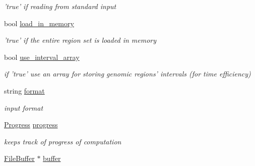 \begin{CompactItemize}
\begin{CompactList}\small\item\em 'true' if reading from standard input \item\end{CompactList}\item 
\hypertarget{classGenomicRegionSet_de43c6cd72b95da75395129b00a52687}{
bool \hyperlink{classGenomicRegionSet_de43c6cd72b95da75395129b00a52687}{load\_\-in\_\-memory}}
\label{classGenomicRegionSet_de43c6cd72b95da75395129b00a52687}

\begin{CompactList}\small\item\em 'true' if the entire region set is loaded in memory \item\end{CompactList}\item 
\hypertarget{classGenomicRegionSet_ea8b5c9bae036da50d4e8720d2e13231}{
bool \hyperlink{classGenomicRegionSet_ea8b5c9bae036da50d4e8720d2e13231}{use\_\-interval\_\-array}}
\label{classGenomicRegionSet_ea8b5c9bae036da50d4e8720d2e13231}

\begin{CompactList}\small\item\em if 'true' use an array for storing genomic regions' intervals (for time efficiency) \item\end{CompactList}\item 
\hypertarget{classGenomicRegionSet_a4494ed2ae3f7594c29b18c39fed6748}{
string \hyperlink{classGenomicRegionSet_a4494ed2ae3f7594c29b18c39fed6748}{format}}
\label{classGenomicRegionSet_a4494ed2ae3f7594c29b18c39fed6748}

\begin{CompactList}\small\item\em input format \item\end{CompactList}\item 
\hypertarget{classGenomicRegionSet_08d9a35a7688ac2c193b53c9a8693c6e}{
\hyperlink{classProgress}{Progress} \hyperlink{classGenomicRegionSet_08d9a35a7688ac2c193b53c9a8693c6e}{progress}}
\label{classGenomicRegionSet_08d9a35a7688ac2c193b53c9a8693c6e}

\begin{CompactList}\small\item\em keeps track of progress of computation \item\end{CompactList}\item 
\hypertarget{classGenomicRegionSet_df3a5598e31ddbb5b381125925362085}{
\hyperlink{classFileBuffer}{FileBuffer} $\ast$ \hyperlink{classGenomicRegionSet_df3a5598e31ddbb5b381125925362085}{buffer}}
\label{classGenomicRegionSet_df3a5598e31ddbb5b381125925362085}


\end{CompactItemize}
